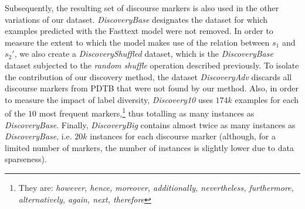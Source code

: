 \documentclass[11pt,a4paper]{article}
\begin{document}
Subsequently, the resulting set of discourse markers is also used in the other variations of our dataset.  \textit{DiscoveryBase} designates the dataset for which examples predicted with the Fasttext model were not removed.  In order to measure the extent to which the model makes use of the relation between $s_1$ and $s_2'$, we also create a \textit{DiscoveryShuffled} dataset, which is the \textit{DiscoveryBase} dataset subjected to the \textit{random shuffle} operation described previously. To isolate the contribution of our discovery method, the dataset {\it DiscoveryAdv} discards all discourse markers from PDTB that were not found by our method. Also, in order to measure the impact of label diversity, {\it Discovery10} uses $174k$ examples for each of the $10$ most frequent markers,\footnote{They are: {\it however, hence, moreover, additionally, nevertheless, furthermore, alternatively, again, next, therefore}} thus totalling as many instances as {\it DiscoveryBase}.
Finally, \textit{DiscoveryBig} contains almost twice as many instances as {\it DiscoveryBase}, i.e. $20k$ instances for each discourse marker (although, for a limited number of markers, the number of instances is slightly lower due to data sparseness).
\end{document}
